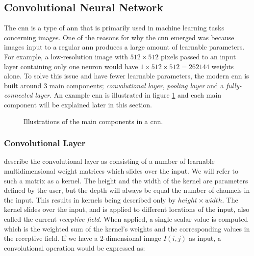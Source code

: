 \subsection{Convolutional Neural Network} \label{cnn}
    The \gls{cnn} is a type of \gls{ann} that is primarily used in machine learning tasks concerning images\cite{o2015introduction_convolutions}. One of the reasons for why the \gls{cnn} emerged was because images input to a regular \gls{ann} produces a large amount of learnable parameters. For example, a low-resolution image with $512\times512$ pixels passed to an input layer containing only one neuron would have $1\times512\times512 = 262144$ weights alone.  To solve this issue and have fewer learnable parameters, the modern \gls{cnn} is built around 3 main components\cite{o2015introduction_convolutions}; \textit{convolutional layer}, \textit{pooling layer} and a \textit{fully-connected layer}. An example \gls{cnn} is illustrated in figure \ref{convolutional_neural_network_fig} and each main component will be explained later in this section.

    \begin{figure}[H]
        \centering
                        
        \caption[Convolutional neural network example]{Illustrations of the main components in a \gls{cnn}.}
      	\medskip 
        \label{convolutional_neural_network_fig}
    \end{figure}



    \subsubsection{Convolutional Layer}
    
    
     \citeauthor{o2015introduction_convolutions}\cite{o2015introduction_convolutions} describe the convolutional layer as consisting of a number of learnable multidimensional weight matrices which slides over the input. We will refer to such a matrix as a kernel. The height and the width of the kernel are parameters defined by the user, but the depth will always be equal the number of channels in the input. This results in kernels being described only by $height \times width$. The kernel slides over the input, and is applied to different locations of the input, also called the current \textit{receptive field}. When applied, a single scalar value is computed which is the weighted sum of the kernel's weights and the corresponding values in the receptive field. If we have a 2-dimensional image $I(i,j)$ as input, a convolutional operation would be expressed as\cite{Goodfellow-et-al-2016_convolution}:
     
